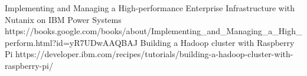 %
%
%


\begin{publications}
    \publication
        {Implementing and Managing a High-performance Enterprise Infrastructure with Nutanix on IBM Power Systems}
        {https://books.google.com/books/about/Implementing\_and\_Managing\_a\_High\_perform.html?id=yR7UDwAAQBAJ}
    \publication
        {Building a Hadoop cluster with Raspberry Pi}
        {https://developer.ibm.com/recipes/tutorials/building-a-hadoop-cluster-with-raspberry-pi/}
\end{publications}